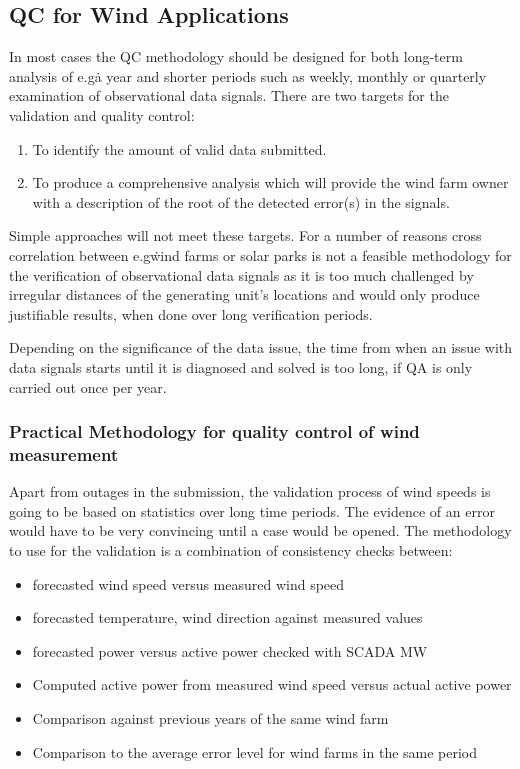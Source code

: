 \subsection{QC for Wind Applications}

In most cases the QC methodology should be designed for both long-term analysis of e.g\. a year and shorter periods such as weekly, monthly or quarterly examination of observational data signals. There are two targets for the validation and quality control:

\begin{enumerate}
\item To identify the amount of valid data submitted.
\item To produce a comprehensive analysis which will provide the wind farm owner with a description of the root of the detected error(s) in the signals.
\end{enumerate}

Simple approaches will not meet these targets. For a number of reasons cross correlation between e.g\. wind farms or solar parks is not a feasible methodology for the verification of observational data signals as it is too much challenged by irregular distances of the generating unit's locations and would only produce justifiable results, when done over long verification periods.

Depending on the significance of the data issue, the time from when an issue with data signals starts until it is diagnosed and solved is too long, if QA is only carried out once per year.


\subsubsection{Practical Methodology for quality control of wind measurement}

Apart from outages in the submission, the validation process of wind speeds is going to be based on statistics over long time periods. The evidence of an error would have to be very convincing until a case would be opened. The methodology to use for the validation is a combination of consistency checks between:
\begin{itemize}
 \vspace{-0.2cm}\item forecasted wind speed versus measured wind speed
 \vspace{-0.2cm}\item forecasted temperature, wind direction against measured values
 \vspace{-0.2cm}\item forecasted power versus active power checked with SCADA MW
 \vspace{-0.2cm}\item Computed active power from measured wind speed versus actual active power
 \vspace{-0.2cm}\item Comparison against previous years of the same wind farm
 \vspace{-0.2cm}\item Comparison to the average error level for wind farms in the same period
\end{itemize}

